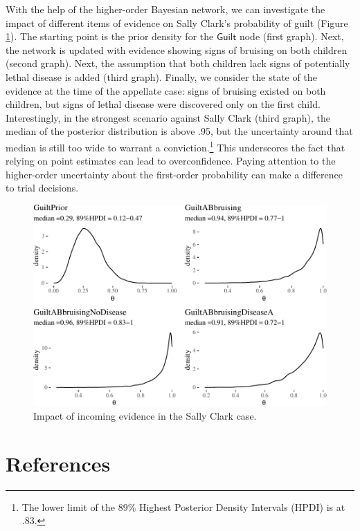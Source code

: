 \documentclass[
  10pt,
  dvipsnames,enabledeprecatedfontcommands]{scrartcl}
\newcommand{\s}[1]{\mbox{$\mathsf{#1}$}}
\begin{document}
With the help of the higher-order Bayesian network, we can investigate
the impact of different items of evidence on Sally Clark's probability
of guilt (Figure \ref{fig:SCwithHOP2}). The starting point is the prior
density for the \s{Guilt} node (first graph). Next, the network is
updated with evidence showing signs of bruising on both children (second
graph). Next, the assumption that both children lack signs of
potentially lethal disease is added (third graph). Finally, we consider
the state of the evidence at the time of the appellate case: signs of
bruising existed on both children, but signs of lethal disease were
discovered only on the first child. Interestingly, in the strongest
scenario against Sally Clark (third graph), the median of the posterior
distribution is above .95, but the uncertainty around that median is
still too wide to warrant a conviction.\footnote{The lower limit of the
  89\% Highest Posterior Density Intervals (HPDI) is at .83.} This
underscores the fact that relying on point estimates can lead to
overconfidence. Paying attention to the higher-order uncertainty about
the first-order probability can make a difference to trial decisions.

\begin{figure}[H]

\begin{center}\includegraphics[width=0.9\linewidth]{paper-outline_files/figure-latex/SCwithHOP2-1} \end{center}


\caption{Impact of incoming evidence in the Sally Clark case.}
\label{fig:SCwithHOP2}
\end{figure}

\hypertarget{references}{%
\section*{References}\label{references}}
\end{document}
